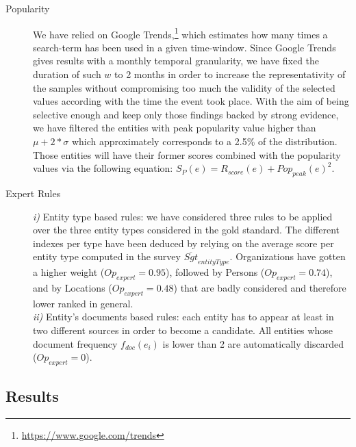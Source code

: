 \documentclass{llncs}
\begin{document}
\begin{description}
\item [Popularity] We have relied on Google Trends,\footnote{\url{https://www.google.com/trends}} which estimates how many times a search-term has been used in a given time-window. Since Google Trends gives results with a monthly temporal granularity, we have fixed the duration of such $w$ to 2 months in order to increase the representativity of the samples without compromising too much the validity of the selected values according with the time the event took place. With the aim of being selective enough and keep only those findings backed by strong evidence, we have filtered the entities with peak popularity value higher than $\mu+2*\sigma$ which approximately corresponds to a 2.5\% of the distribution. Those entities will have their former scores combined with the popularity values via the following equation: $S_{P}\left ( e \right ) =  R_{score}\left ( e \right ) +Pop_{peak}(e)^{2} $.
\item[Expert Rules] \textit{i)} Entity type based rules: we have considered three rules to be applied over the three entity types considered in the gold standard. The different indexes per type have been deduced by relying on the average score per entity type computed in the survey $\overline{Sgt}_{entityType}$. 
Organizations have gotten a higher weight ($Op _{expert}=0.95$), followed by Persons ($Op _{expert}=0.74$), and by Locations ($Op _{expert}=0.48$) that are badly considered and therefore lower ranked in general. \\
\textit{ii)} Entity's documents based rules: each entity has to appear at least in two different sources in order to become a candidate. All entities whose document frequency $f_{doc}(e_i)$ is lower than 2 are automatically discarded ($Op _{expert} = 0$).
\end{description}

\subsection{Results}
\label{sec:results}
\end{document}
